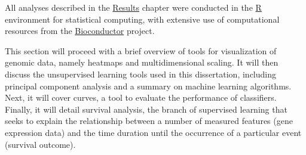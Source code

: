 All analyses described in the \hyperref[chap:results]{\textsf{Results}} chapter
were conducted in the \href{http://www.r-project.org/}{\textsf{R}} environment
for statistical computing,\cite{r_core_team_r:_2014} with extensive use of
computational resources from the
\href{http://www.bioconductor.org/}{\textsf{Bioconductor}}
project.\cite{gentleman_bioconductor:_2004}






\medskip

This section will proceed with a brief overview of tools for visualization of
genomic data, namely heatmaps and multidimensional scaling.  It will then
discuss the unsupervised learning tools used in this dissertation, including
principal component analysis %
and a summary on machine learning algorithms.  Next, it will cover
 curves, a tool to evaluate the performance of classifiers.
Finally, it will detail survival analysis, the branch of supervised learning
that seeks to explain the relationship between a number of measured features
(gene expression data) and the time duration until the occurrence of a
particular event (survival outcome).

